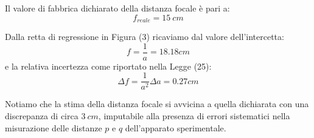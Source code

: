 Il valore di fabbrica dichiarato della distanza focale è pari a:
\begin{equation}
	f_{reale} = 15\ cm
\end{equation}

Dalla retta di regressione in Figura (3) ricaviamo dal valore dell'intercetta:
\begin{equation}
	f = \frac{1}{a} = 18.18 cm
\end{equation}
e la relativa incertezza come riportato nella Legge (25):
\begin{equation}
	\Delta f = \frac{1}{a^2}\Delta a = 0.27 cm
\end{equation}

Notiamo che la stima della distanza focale si avvicina a quella dichiarata con una discrepanza 
di circa $3\ cm$, imputabile alla presenza di errori sistematici nella misurazione delle distanze $p$ e $q$ dell'apparato sperimentale. 
